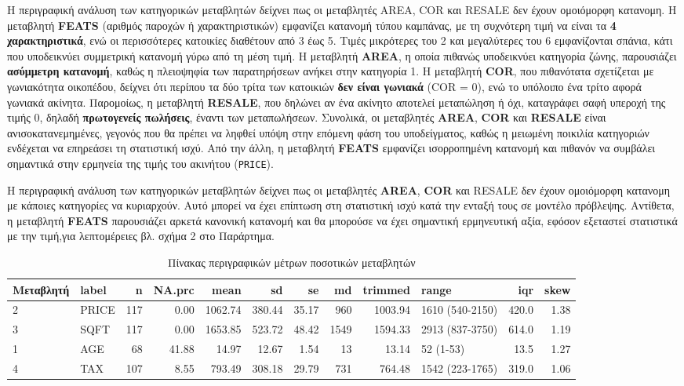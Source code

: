 \documentclass[
  10pt,
]{article}
\begin{document}
Η περιγραφική ανάλυση των κατηγορικών μεταβλητών δείχνει πως οι
μεταβλητές AREA, COR και RESALE δεν έχουν ομοιόμορφη κατανομη. Η
μεταβλητή \textbf{FEATS} (αριθμός παροχών ή χαρακτηριστικών) εμφανίζει
κατανομή τύπου καμπάνας, με τη συχνότερη τιμή να είναι τα
\textbf{4 χαρακτηριστικά}, ενώ οι περισσότερες κατοικίες διαθέτουν από 3
έως 5. Τιμές μικρότερες του 2 και μεγαλύτερες του 6 εμφανίζονται σπάνια,
κάτι που υποδεικνύει συμμετρική κατανομή γύρω από τη μέση τιμή. Η
μεταβλητή \textbf{AREA}, η οποία πιθανώς υποδεικνύει κατηγορία ζώνης,
παρουσιάζει \textbf{ασύμμετρη κατανομή}, καθώς η πλειοψηφία των
παρατηρήσεων ανήκει στην κατηγορία 1. Η μεταβλητή \textbf{COR}, που
πιθανότατα σχετίζεται με γωνιακότητα οικοπέδου, δείχνει ότι περίπου τα
δύο τρίτα των κατοικιών \textbf{δεν είναι γωνιακά} (COR = 0), ενώ το
υπόλοιπο ένα τρίτο αφορά γωνιακά ακίνητα. Παρομοίως, η μεταβλητή
\textbf{RESALE}, που δηλώνει αν ένα ακίνητο αποτελεί μεταπώληση ή όχι,
καταγράφει σαφή υπεροχή της τιμής 0, δηλαδή
\textbf{πρωτογενείς πωλήσεις}, έναντι των μεταπωλήσεων. Συνολικά, οι
μεταβλητές \textbf{AREA}, \textbf{COR} και \textbf{RESALE} είναι
ανισοκατανεμημένες, γεγονός που θα πρέπει να ληφθεί υπόψη στην επόμενη
φάση του υποδείγματος, καθώς η μειωμένη ποικιλία κατηγοριών ενδέχεται να
επηρεάσει τη στατιστική ισχύ. Από την άλλη, η μεταβλητή \textbf{FEATS}
εμφανίζει ισορροπημένη κατανομή και πιθανόν να συμβάλει σημαντικά στην
ερμηνεία της τιμής του ακινήτου (\texttt{PRICE}).

Η περιγραφική ανάλυση των κατηγορικών μεταβλητών δείχνει πως οι
μεταβλητές \textbf{AREA}, \textbf{COR} και RESALE δεν έχουν ομοιόμορφη
κατανομη με κάποιες κατηγορίες να κυριαρχούν. Αυτό μπορεί να έχει
επίπτωση στη στατιστική ισχύ κατά την ενταξή τους σε μοντέλο πρόβλεψης.
Αντίθετα, η μεταβλητή \textbf{FEATS} παρουσιάζει αρκετά κανονική
κατανομή και θα μπορούσε να έχει σημαντική ερμηνευτική αξία, εφόσον
εξεταστεί στατιστικά με την τιμή,για λεπτομέρειες βλ. σχήμα 2 στο
Παράρτημα.

\begin{table}

\caption{\label{tab:desc}Πίνακας περιγραφικών μέτρων ποσοτικών μεταβλητών}
\centering
\begin{tabular}[t]{llrrrrrrrlrr}
\toprule
Μεταβλητή & label & n & NA.prc & mean & sd & se & md & trimmed & range & iqr & skew\\
\midrule
2 & PRICE & 117 & 0.00 & 1062.74 & 380.44 & 35.17 & 960 & 1003.94 & 1610 (540-2150) & 420.0 & 1.38\\
3 & SQFT & 117 & 0.00 & 1653.85 & 523.72 & 48.42 & 1549 & 1594.33 & 2913 (837-3750) & 614.0 & 1.19\\
1 & AGE & 68 & 41.88 & 14.97 & 12.67 & 1.54 & 13 & 13.14 & 52 (1-53) & 13.5 & 1.27\\
4 & TAX & 107 & 8.55 & 793.49 & 308.18 & 29.79 & 731 & 764.48 & 1542 (223-1765) & 319.0 & 1.06\\
\bottomrule
\end{tabular}
\end{table}
\end{document}
